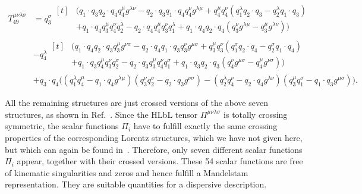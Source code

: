 \documentclass[epj]{webofc}
\newcommand{\<}{\langle}
\renewcommand{\>}{\rangle}
\newcommand{\mytag}{\\[-\baselineskip] \stepcounter{equation}\tag{\theequation}}
\begin{document}
\begin{align}
		T_{49}^{\mu\nu\lambda\sigma} &= q_3^\sigma  \begin{aligned}[t]
				& \Big( q_1\cdot q_3 q_2\cdot q_4 q_4^\mu
                  g^{\lambda\nu} - q_2\cdot q_3 q_1\cdot q_4 q_4^\nu
                  g^{\lambda\mu} + q_4^\mu q_4^\nu \left( q_1^\lambda
                  q_2\cdot q_3 - q_2^\lambda q_1\cdot q_3 \right) \nonumber
                  \\
				& + q_1\cdot q_4 q_3^\mu q_4^\nu
                  q_2^\lambda - q_2\cdot q_4 q_4^\mu q_3^\nu q_1^\lambda +
                  q_1\cdot q_4 q_2\cdot q_4 \left(q_3^\nu g^{\lambda\mu} -
                  q_3^\mu g^{\lambda\nu}\right) \Big) \end{aligned}
                \\
			& - q_4^\lambda \begin{aligned}[t]
				& \Big( q_1\cdot q_4 q_2\cdot q_3 q_3^\mu
                  g^{\nu\sigma} - q_2\cdot q_4 q_1\cdot q_3 q_3^\nu
                  g^{\mu\sigma} + q_3^\mu q_3^\nu \left(q_1^\sigma q_2\cdot
                  q_4 - q_2^\sigma q_1\cdot q_4\right)  \\
				& + q_1\cdot q_3 q_4^\mu q_3^\nu q_2^\sigma
                  - q_2\cdot q_3 q_3^\mu q_4^\nu q_1^\sigma + q_1\cdot q_3
                  q_2\cdot q_3 \left( q_4^\nu g^{\mu\sigma} - q_4^\mu
                  g^{\nu\sigma} \right) \Big) \end{aligned}  \\
			& + q_3\cdot q_4 \Big(\left(q_1^\lambda q_4^\mu -
                q_1\cdot q_4 g^{\lambda\mu}\right) \left(q_3^\nu q_2^\sigma
                - q_2\cdot q_3 g^{\nu\sigma}\right) - \left(q_2^\lambda
                q_4^\nu - q_2\cdot q_4 g^{\lambda\nu}\right) \left(q_3^\mu
                q_1^\sigma - q_1\cdot q_3 g^{\mu\sigma}\right)\Big) . \quad
                \nonumber %
\end{align}

All the remaining structures are just crossed versions of the above seven
structures, as shown in Ref.~\cite{Colangelo:2015ama}.  Since the HLbL
tensor $\Pi^{\mu\nu\lambda\sigma}$ is totally crossing symmetric, the
scalar functions $\Pi_i$ have to fulfill exactly the same crossing
properties of the corresponding Lorentz structures, which we have not given
here, but which can again be found in~\cite{Colangelo:2015ama}.  Therefore,
only seven different scalar functions $\Pi_i$ appear, together with their
crossed versions. These 54 scalar functions are free of kinematic
singularities and zeros and hence fulfill a Mandelstam
representation. They are suitable quantities for a dispersive description.
\end{document}
